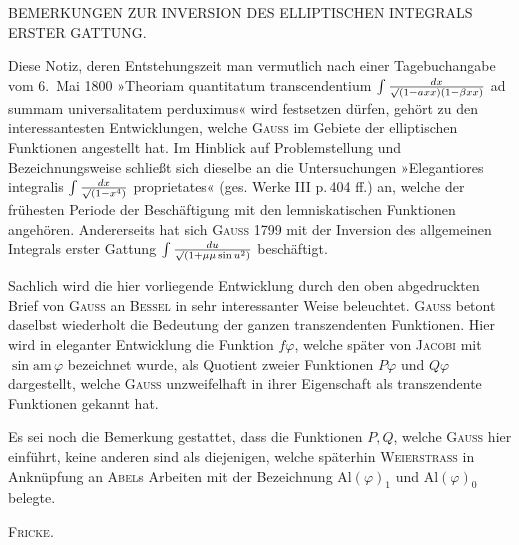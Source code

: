 %

\begin{center}
BEMERKUNGEN ZUR INVERSION DES ELLIPTISCHEN INTEGRALS ERSTER GATTUNG.
\end{center}

\noindent\hspace*{\parindent}Diese Notiz, deren Entstehungszeit man vermutlich nach einer Tagebuchangabe vom 6.\ Mai 1800 »Theoriam quantitatum transcendentium $\int\frac{dx}{\mathord{\surd}(1-a xx)(1-\beta xx)}$ ad summam universalitatem perduximus« wird festsetzen dürfen, gehört zu den interessantesten Entwicklungen, welche \textsc{Gauss} im Gebiete der elliptischen Funktionen angestellt hat. Im Hinblick auf Problemstellung und Bezeichnungsweise schließt sich dieselbe an die Untersuchungen »Elegantiores integralis $\int\frac{dx}{\mathord{\surd}(1-x^4)}$ proprietates« (ges. Werke III p.\,404 ff.) an, welche der frühesten Periode der Beschäftigung mit den lemniskatischen Funktionen angehören. Andererseits hat sich \textsc{Gauss} 1799 mit der Inversion des allgemeinen Integrals erster Gattung $\int\frac{du}{\mathord{\surd}(1+\mu\mu\sin u^2)}$ beschäftigt.

Sachlich wird die hier vorliegende Entwicklung durch den oben abgedruckten Brief von \textsc{Gauss} an \textsc{Bessel} in sehr interessanter Weise beleuchtet. \textsc{Gauss} betont daselbst wiederholt die Bedeutung der ganzen transzendenten Funktionen. Hier wird in eleganter Entwicklung die Funktion $f\varphi$, welche später von \textsc{Jacobi} mit $\sin\mathrm{am}\,\varphi$ bezeichnet wurde, als Quotient zweier Funktionen $P\varphi$ und $Q\varphi$ dargestellt, welche \textsc{Gauss} unzweifelhaft in ihrer Eigenschaft als  transzendente Funktionen gekannt hat.

Es sei noch die Bemerkung gestattet, dass die Funktionen $P, Q$, welche \textsc{Gauss} hier einführt, keine anderen sind als diejenigen, welche späterhin \textsc{Weierstrass} in Anknüpfung an \textsc{Abel}s Arbeiten mit der Bezeichnung $\mathrm{Al}(\varphi)_1$ und $\mathrm{Al}(\varphi)_0$ belegte.

\hfill \textsc{Fricke}.

\bigskip

